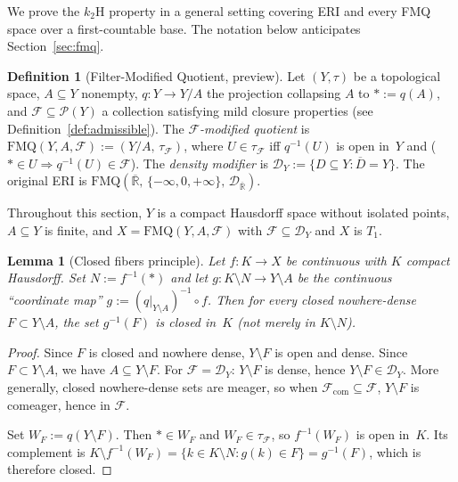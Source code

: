 \documentclass[11pt]{article}
\newtheorem{lemma}[theorem]{Lemma}
\theoremstyle{definition}
\newtheorem{definition}[theorem]{Definition}
\theoremstyle{remark}
\begin{document}
We prove the $k_2$H property in a general setting covering ERI and
every FMQ space over a first-countable base.
The notation below anticipates Section~\ref{sec:fmq}.

\begin{definition}[Filter-Modified Quotient, preview]\label{def:fmq-preview}
Let $(Y, \tau)$ be a topological space, $A \subseteq Y$ nonempty,
$q\colon Y \to Y/A$ the projection collapsing $A$ to
$\ast := q(A)$, and $\mathcal{F} \subseteq \mathcal{P}(Y)$ a
collection satisfying mild closure properties
(see Definition~\ref{def:admissible}).
The \emph{$\mathcal{F}$-modified quotient} is
$\mathrm{FMQ}(Y, A, \mathcal{F}) := (Y/A,\, \tau_{\mathcal{F}})$,
where $U \in \tau_{\mathcal{F}}$ iff $q^{-1}(U)$ is open in~$Y$
and ($\ast \in U \Rightarrow q^{-1}(U) \in \mathcal{F}$).
The \emph{density modifier} is
$\mathcal{D}_Y := \{D \subseteq Y : \overline{D} = Y\}$.
The original ERI is
$\mathrm{FMQ}(\overline{\mathbb{R}},\,\{-\infty,0,+\infty\},\,
\mathcal{D}_{\overline{\mathbb{R}}})$.
\end{definition}

Throughout this section, $Y$ is a compact Hausdorff space without
isolated points, $A \subseteq Y$ is finite, and
$X = \mathrm{FMQ}(Y, A, \mathcal{F})$ with $\mathcal{F} \subseteq
\mathcal{D}_Y$ and $X$ is $T_1$.

\begin{lemma}[Closed fibers principle]\label{lem:closedfibers}
Let $f\colon K \to X$ be continuous with $K$ compact Hausdorff. Set
$N := f^{-1}(\ast)$ and let $g\colon K \setminus N \to Y \setminus A$ be the
continuous ``coordinate map'' $g := (q|_{Y \setminus A})^{-1} \circ f$.
Then for every closed nowhere-dense $F \subset Y \setminus A$, the set
$g^{-1}(F)$ is closed in~$K$ \textup{(}not merely in $K \setminus N$\textup{)}.
\end{lemma}

\begin{proof}
Since $F$ is closed and nowhere dense, $Y \setminus F$ is open and dense.
Since $F \subset Y \setminus A$, we have $A \subseteq Y \setminus F$.
For $\mathcal{F} = \mathcal{D}_Y$: $Y \setminus F$ is dense, hence
$Y \setminus F \in \mathcal{D}_Y$.
More generally, closed nowhere-dense sets are meager, so when
$\mathcal{F}_{\mathrm{com}} \subseteq \mathcal{F}$,
$Y \setminus F$ is comeager, hence in $\mathcal{F}$.

Set $W_F := q(Y \setminus F)$. Then $\ast \in W_F$ and
$W_F \in \tau_{\mathcal{F}}$, so $f^{-1}(W_F)$ is open in~$K$.
Its complement is
$K \setminus f^{-1}(W_F) = \{k \in K \setminus N : g(k) \in F\}
= g^{-1}(F)$, which is therefore closed.
\end{proof}
\end{document}
